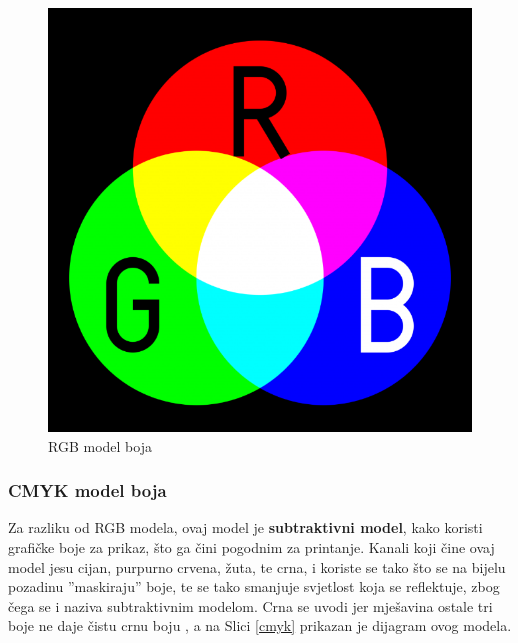 \documentclass[12pt,a4paper]{article}
\begin{document}
\begin{figure}[H]

\center
\includegraphics[scale=0.75]{../res/rgb.png}
\caption{RGB model boja \cite{bels3}}
\label{rgb}

\end{figure}

\subsubsection{CMYK model boja}

Za razliku od RGB modela, ovaj model je \textbf{subtraktivni model}, kako koristi grafičke boje za prikaz, što ga čini pogodnim za printanje. Kanali koji čine ovaj model jesu cijan, purpurno crvena, žuta, te crna, i koriste se tako što se na bijelu pozadinu ''maskiraju'' boje, te se tako smanjuje svjetlost koja se reflektuje, zbog čega se i naziva subtraktivnim modelom. Crna se uvodi jer mješavina ostale tri boje ne daje čistu crnu boju \cite{bels2}, a na Slici \ref	{cmyk} prikazan je dijagram ovog modela.
\end{document}
